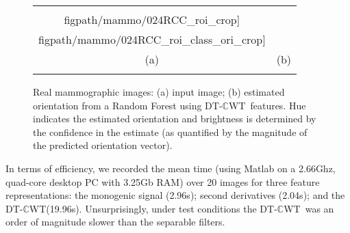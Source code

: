 \documentclass[10pt,twocolumn,letterpaper]{article}
\newcommand{\fref}[1]{Figure~\ref{#1}}
\def\dtcwt{DT-$\mathbb{C}$WT}
\begin{document}
\begin{figure}[t]
\centering
\begin{tabular}{@{}c c@{}}
\texttt{[image: \\figpath/mammo/024RCC\_roi\_crop]} &
\texttt{[image: \\figpath/mammo/024RCC\_roi\_class\_ori\_crop]} \\
(a) & (b) \\
\noalign{\smallskip}
\end{tabular}
%
\caption{Real mammographic images: %
(a) input image; %
(b) estimated orientation from a Random Forest using \dtcwt~features. Hue indicates the estimated orientation and brightness is determined by the confidence in the estimate (as quantified by the magnitude of the predicted orientation vector).}
\label{f:real_mammography}
\end{figure}

In terms of efficiency, we recorded the mean time (using Matlab on a 2.66Ghz, quad-core desktop PC with 3.25Gb RAM) over 20 images for three feature representations: the monogenic signal (2.96s); second derivatives (2.04s); and the \dtcwt (19.96s). Unsurprisingly, under test conditions the \dtcwt~was an order of magnitude slower than the separable filters. %


\end{document}
